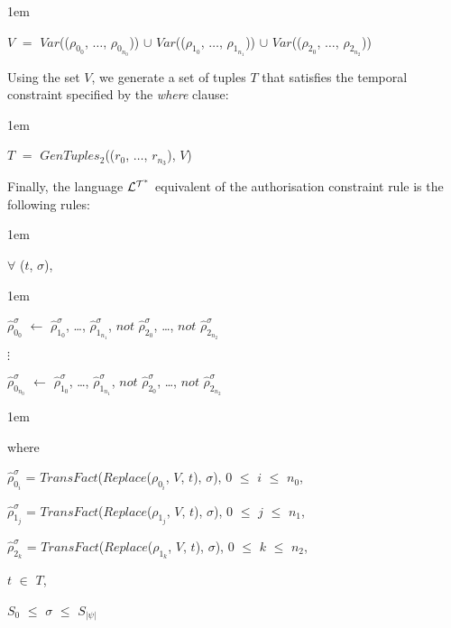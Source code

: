 \documentclass[11pt]{report}
\newenvironment{vquote}
{
  \begin{list}{}{\leftmargin 1em}\item[]
}
{
  \end{list}
}
\begin{document}
            \begin{vquote}
              $V$ $=$
              $Var$(($\rho_{0_0}$, $\ldots$, $\rho_{0_{n_0}}$)) $\cup$
              $Var$(($\rho_{1_0}$, $\ldots$, $\rho_{1_{n_1}}$)) $\cup$
              $Var$(($\rho_{2_0}$, $\ldots$, $\rho_{2_{n_2}}$))
            \end{vquote}

            \noindent
            Using the set $V$, we generate a set of tuples $T$ that satisfies
            the temporal constraint specified by the {\em where} clause:

            \begin{vquote}
              $T$ $=$ $GenTuples_2$(($r_0$, $\ldots$, $r_{n_3}$), $V$)
            \end{vquote}

            \noindent
            Finally, the language ${\cal L^{T^*}}$ equivalent of the
            authorisation constraint rule is the following rules:

            \begin{vquote}
              $\forall$ ($t$, $\sigma$),
            \end{vquote}

            \begin{vquote}
              $\hat{\rho}^{\sigma}_{0_0}$ $\leftarrow$
              $\hat{\rho}^{\sigma}_{1_0}$, \ldots, $\hat{\rho}^{\sigma}_{1_{n_1}}$,
              $not$ $\hat{\rho}^{\sigma}_{2_0}$, \ldots, $not$ $\hat{\rho}^{\sigma}_{2_{n_2}}$

              $\vdots$

              $\hat{\rho}^{\sigma}_{0_{n_0}}$ $\leftarrow$
              $\hat{\rho}^{\sigma}_{1_0}$, \ldots, $\hat{\rho}^{\sigma}_{1_{n_1}}$,
              $not$ $\hat{\rho}^{\sigma}_{2_0}$, \ldots, $not$ $\hat{\rho}^{\sigma}_{2_{n_2}}$
            \end{vquote}

            \begin{vquote}
              where

              \hspace{1em}
              $\hat{\rho}^{\sigma}_{0_i}$ =
              $TransFact$($Replace$($\rho_{0_i}$, $V$, $t$), $\sigma$),
              $0$ $\leq$ $i$ $\leq$ $n_0$,

              \hspace{1em}
              $\hat{\rho}^{\sigma}_{1_j}$ =
              $TransFact$($Replace$($\rho_{1_j}$, $V$, $t$), $\sigma$),
              $0$ $\leq$ $j$ $\leq$ $n_1$,

              \hspace{1em}
              $\hat{\rho}^{\sigma}_{2_k}$ =
              $TransFact$($Replace$($\rho_{1_k}$, $V$, $t$), $\sigma$),
              $0$ $\leq$ $k$ $\leq$ $n_2$,

              \hspace{1em}
              $t$ $\in$ $T$,

              \hspace{1em}
              $S_{0}$ $\leq$ $\sigma$ $\leq$ $S_{|\psi|}$
            \end{vquote}
\end{document}
